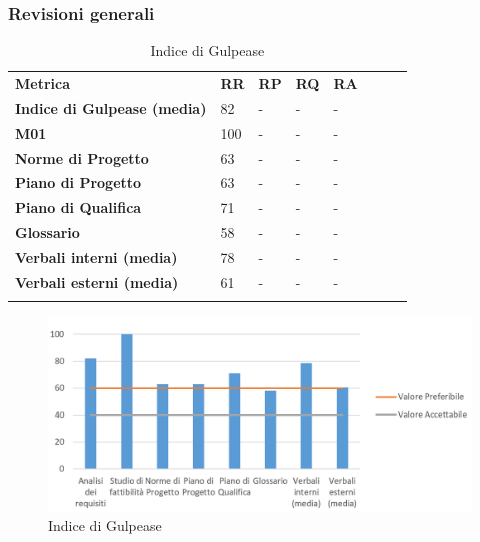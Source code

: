 \subsubsection{Revisioni generali}\mbox{}
\begin{longtable} {						
		>{}p{50mm}  		
		>{}p{8mm}		
		>{}p{8mm}		
		>{}p{8mm}		
		>{}p{8mm}		
		>{}p{8mm}		
		>{}p{8mm}
		>{}p{8mm}				
	}			
	\rowcolor{gray!50}
	\textbf{Metrica} & \textbf{RR} & \textbf{RP} & \textbf{RQ} & \textbf{RA} \TBstrut \\ [2mm]
	\textbf{Indice di Gulpease (media)} & 82 & - & - & - \TBstrut \\ [2mm]
	\textbf{M01} & 100 & - & - & - \TBstrut \\ [2mm]
	\textbf{Norme di Progetto} & 63 & - & - & - \TBstrut \\ [2mm]
	\textbf{Piano di Progetto} & 63 & - & - & - \TBstrut \\ [2mm]
	\textbf{Piano di Qualifica} & 71 & - & - & - \TBstrut \\ [2mm]
	\textbf{Glossario} & 58 & - & - & - \TBstrut \\ [2mm]
	\textbf{Verbali interni (media)} & 78 & - & - & - \TBstrut \\ [2mm]
	\textbf{Verbali esterni (media)}& 61 & - & - & - \TBstrut \\ [2mm]
	\rowcolor{white}
	\caption{Indice di Gulpease}
\end{longtable}
\begin{figure}[H] 	
	\includegraphics[width=\linewidth]{./img/grafici/1.png}	
	\caption{Indice di Gulpease}	
\end{figure}